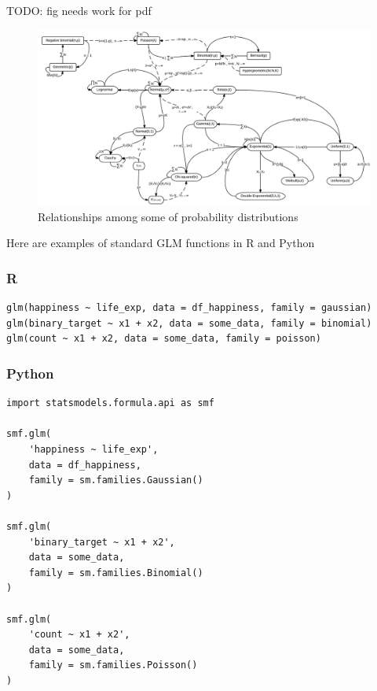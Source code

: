\documentclass[
  letterpaper,
]{krantz}
\newcommand{\blandscape}{\begin{landscape}}
\newcommand{\elandscape}{\end{landscape}}
\begin{document}
TODO: fig needs work for pdf

\newpage

\blandscape

\begin{figure}[H]

{\centering \includegraphics{img/distribution_relationships.jpg}

}

\caption{Relationships among some of probability distributions}

\end{figure}%

\elandscape

\newpage

Here are examples of standard GLM functions in R and Python

\subsubsection{R}

\begin{verbatim}
glm(happiness ~ life_exp, data = df_happiness, family = gaussian)
glm(binary_target ~ x1 + x2, data = some_data, family = binomial)
glm(count ~ x1 + x2, data = some_data, family = poisson)
\end{verbatim}

\subsubsection{Python}

\begin{verbatim}
import statsmodels.formula.api as smf

smf.glm(
    'happiness ~ life_exp', 
    data = df_happiness, 
    family = sm.families.Gaussian()
)

smf.glm(
    'binary_target ~ x1 + x2', 
    data = some_data, 
    family = sm.families.Binomial()
)

smf.glm(
    'count ~ x1 + x2', 
    data = some_data, 
    family = sm.families.Poisson()
)
\end{verbatim}
\end{document}
